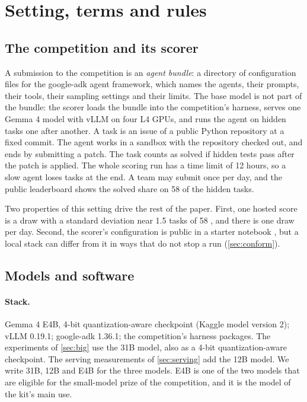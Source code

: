 \section{Setting, terms and rules}\label{sec:setting}



\subsection{The competition and its scorer}

A submission to the competition is an \emph{agent bundle}: a directory of configuration files for the google-adk agent
framework, which names the agents, their prompts, their tools, their sampling settings and their limits. The base
model is not part of the bundle: the scorer loads the bundle into the competition's harness, serves one Gemma 4 model
with vLLM on four L4 GPUs, and runs the agent on hidden tasks one after another. A task is an issue of a public Python
repository at a fixed commit. The agent works in a sandbox with the repository checked out, and ends by submitting a
patch. The task counts as solved if hidden tests pass after the patch is applied. The whole scoring run has a time limit
of 12 hours, so a slow agent loses tasks at the end. A team may submit once per day, and the public leaderboard shows the
solved share on 58 of the hidden tasks.

Two properties of this setting drive the rest of the paper. First, one hosted score is a draw with a standard
deviation near 1.5 tasks of 58 \citep{afshar2026census,mobassir2026toosmall}, and there is one draw per day. Second,
the scorer's configuration is public in a starter notebook \citep{holbrook2026starter}, but a local stack can differ
from it in ways that do not stop a run (\cref{sec:conform}).

\subsection{Models and software}

\paragraph{Stack.} Gemma 4 E4B, 4-bit quantization-aware checkpoint (Kaggle model version 2); vLLM 0.19.1; google-adk
1.36.1; the competition's harness packages. The experiments of \cref{sec:big} use the 31B model, also as a 4-bit
quantization-aware checkpoint. The serving measurements of \cref{sec:serving} add the 12B model. We write 31B, 12B and
E4B for the three models. E4B is one of the two models that are eligible for the small-model prize of the competition,
and it is the model of the kit's main use.

